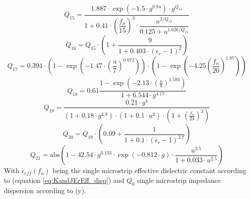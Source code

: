 \documentclass[10pt]{report}
\begin{document}
\begin{equation}
Q_{15} = \dfrac{ 1.887\cdot \exp(-1.5\cdot g^{0.84})\cdot g^{Q_{14}} }
              { 1 + 0.41\cdot \left( \dfrac{f_n}{15} \right) ^3 \cdot
	        \dfrac{u^{2/Q_{13}}}{0.125 + u^{1.626/Q_{13}}}}
\end{equation}
\begin{equation}
Q_{16} = Q_{15}\cdot \left( 1 + \frac{9}{1+0.403\cdot (\epsilon_r-1)^2} \right)
\end{equation}
\begin{equation}
Q_{17} = 0.394\cdot \left( 1-\exp\left( -1.47\cdot\left( \frac{u}{7} \right) ^{0.672} \right) \right)
        \cdot \left( 1-\exp\left( -4.25\left( \frac{f_n}{20} \right) ^{1.87} \right) \right)
\end{equation}
\begin{equation}
Q_{18} = 0.61\frac{1-\exp\left( -2.13\cdot\left( \frac{u}{8} \right) ^{1.593} \right)}
                  {1+6.544\cdot g^{4.17}}
\end{equation}
\begin{equation}
Q_{19} = \frac{ 0.21\cdot g^4 }{(1+0.18\cdot g^{4.9})\cdot (1+0.1\cdot u^2) \cdot
                \left( 1+\left( \frac{f_n}{24} \right) ^3 \right)}
\end{equation}
\begin{equation}
Q_{20} = Q_{19}\cdot \left( 0.09 + \frac{1}{1+0.1\cdot (\epsilon_r-1)^{2.7}} \right)
\end{equation}
\begin{equation}
Q_{21} = \text{abs}\left( 1-42.54\cdot g^{0.133}\cdot \exp(-0.812\cdot g)
                   \cdot\frac{u^{2.5}}{1+0.033\cdot u^{2.5}} \right)
\end{equation}
With $\epsilon_{eff}(f_n)$ being the single microstrip effective
dielectric constant according to \cite{Kirschning3} (equation
\ref{eq:KandJErEff_disp}) and $Q_0$ single microstrip
impedance dispersion according to (y).

\addvspace{12pt}
\end{document}
